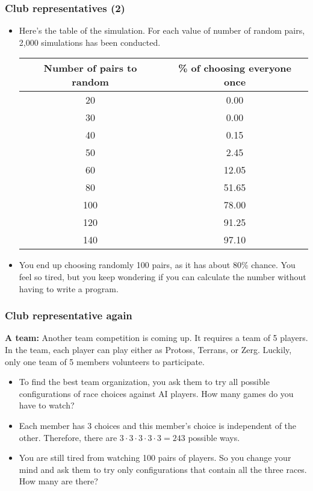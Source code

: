 \begin{frame}\frametitle{Club representatives (2)}
  \begin{itemize}
  \item Here's the table of the simulation.  For each value of number
    of random pairs, 2,000 simulations has been conducted.

    \vspace{0.1in}
    
    {\small
    \begin{tabular}{c|c}
      \hline
      Number of pairs to random & \% of choosing everyone once \\
      \hline
      20 & 0.00 \\
      30 & 0.00 \\
      40 & 0.15 \\
      50 & 2.45 \\
      60 & 12.05 \\
      80 & 51.65 \\
      100 & 78.00 \\
      120 & 91.25 \\
      140 & 97.10 \\ \hline
    \end{tabular}
    }
    \pause

  \item You end up choosing randomly 100 pairs, as it has about 80\%
    chance.  You feel so tired, but you keep wondering if you can
    calculate the number without having to write a program.
  \end{itemize}
\end{frame}

\begin{frame}\frametitle{Club representative again}
  \begin{tcolorbox}
    {\bf A team:} Another team competition is coming up.  It requires
    a team of 5 players.  In the team, each player can play either as
    Protoss, Terrans, or Zerg.  Luckily, only one team of 5 members
    volunteers to participate.
  \end{tcolorbox}

  \begin{itemize}
  \item
    To find the best team organization, you ask them to try all
    possible configurations of race choices against AI players.  How
    many games do you have to watch?  \pause
  \item
    Each member has 3 choices and this member's choice is independent
    of the other.  Therefore, there are $3\cdot 3\cdot 3\cdot 3\cdot 3
    = 243$ possible ways. \pause
  \item
    You are still tired from watching 100 pairs of players.  So you
    change your mind and ask them to try only configurations that
    contain all the three races.  How many are there?
  \end{itemize}
\end{frame}
